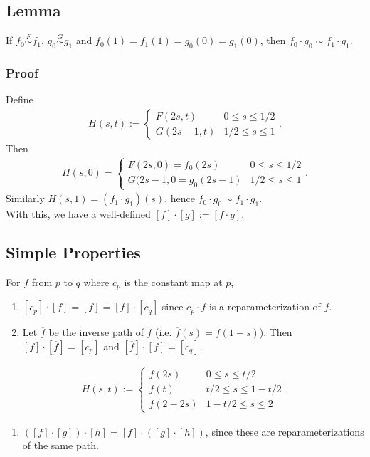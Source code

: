 \documentclass[11pt]{article}
\begin{document}
\subsection*{Lemma}
\label{sec:org5aff9e3}
If \(f_{0}\overset{F}\sim f_{1}\), \(g_{0}\overset{G}\sim g_{1}\) and \(f_{0}(1)=f_{1}(1)=g_{0}(0)=g_{1}(0)\), then \(f_{0}\cdot g_{0}\sim f_{1}\cdot g_{1}\).\\
\subsubsection*{Proof}
\label{sec:org15a7d4f}
Define\\
\begin{align*}
  H(s,t):=\begin{cases}
    F(2s,t) & 0\leq s\leq 1/2 \\
    G(2s-1,t) & 1/2\leq s\leq 1
  \end{cases}.
\end{align*}
Then\\
\begin{align*}
  H(s,0)=\begin{cases}
    F(2s,0)=f_{0}(2s) & 0\leq s\leq 1/2 \\
    G(2s-1,0=g_{0}(2s-1) & 1/2\leq s\leq 1
  \end{cases}.
\end{align*}
Similarly \(H(s,1)=(f_{1}\cdot g_{1})(s)\), hence \(f_{0}\cdot g_{0}\sim f_{1}\cdot g_{1}\).\\
With this, we have a well-defined \([f]\cdot[g]:=[f\cdot g]\).\\
\subsection*{Simple Properties}
\label{sec:org54fb9e2}
For \(f\) from \(p\) to \(q\) where \(c_{p}\) is the constant map at \(p\),\\
\begin{enumerate}
\item \([c_{p}]\cdot[f]=[f]=[f]\cdot[c_{q}]\) since \(c_{p}\cdot f\) is a reparameterization of \(f\).\\
\item Let \(\overline{f}\) be the inverse path of \(f\) (i.e. \(\overline{f}(s)=f(1-s)\)). Then \([f]\cdot[\overline{f}]=[c_{p}]\) and \([\overline{f}]\cdot[f]=[c_{q}]\).\\
\end{enumerate}
\begin{align*}
  H(s,t):=\begin{cases}
    f(2s) & 0\leq s\leq t/2 \\
    f(t) & t/2\leq s\leq 1-t/2 \\
    f(2-2s) & 1-t/2 \leq s\leq 2
  \end{cases}.
\end{align*}
\begin{enumerate}
\item \(([f]\cdot[g])\cdot[h]=[f]\cdot([g]\cdot[h])\), since these are reparameterizations of the same path.\\
\end{enumerate}
\end{document}
